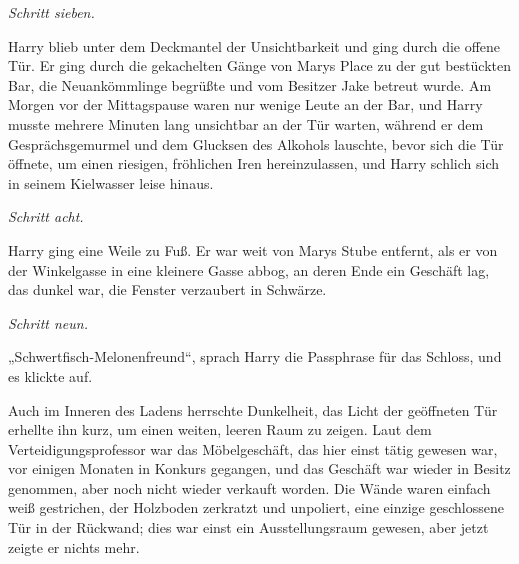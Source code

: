 \emph{Schritt sieben.}

Harry blieb unter dem Deckmantel der Unsichtbarkeit und ging durch die offene Tür. Er ging durch die gekachelten Gänge von Marys Place zu der gut bestückten Bar, die Neuankömmlinge begrüßte und vom Besitzer Jake betreut wurde. Am Morgen vor der Mittagspause waren nur wenige Leute an der Bar, und Harry musste mehrere Minuten lang unsichtbar an der Tür warten, während er dem Gesprächsgemurmel und dem Glucksen des Alkohols lauschte, bevor sich die Tür öffnete, um einen riesigen, fröhlichen Iren hereinzulassen, und Harry schlich sich in seinem Kielwasser leise hinaus.

\emph{Schritt acht.}

Harry ging eine Weile zu Fuß. Er war weit von Marys Stube entfernt, als er von der Winkelgasse in eine kleinere Gasse abbog, an deren Ende ein Geschäft lag, das dunkel war, die Fenster verzaubert in Schwärze.

\emph{Schritt neun.}

„Schwertfisch-Melonenfreund“, sprach Harry die Passphrase für das Schloss, und es klickte auf.

Auch im Inneren des Ladens herrschte Dunkelheit, das Licht der geöffneten Tür erhellte ihn kurz, um einen weiten, leeren Raum zu zeigen. Laut dem Verteidigungsprofessor war das Möbelgeschäft, das hier einst tätig gewesen war, vor einigen Monaten in Konkurs gegangen, und das Geschäft war wieder in Besitz genommen, aber noch nicht wieder verkauft worden. Die Wände waren einfach weiß gestrichen, der Holzboden zerkratzt und unpoliert, eine einzige geschlossene Tür in der Rückwand; dies war einst ein Ausstellungsraum gewesen, aber jetzt zeigte er nichts mehr.

